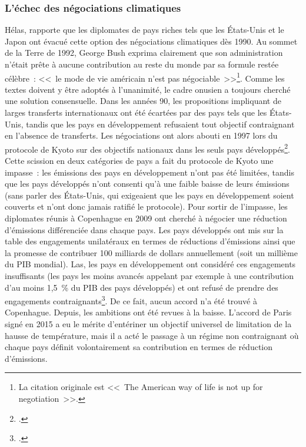 \documentclass[a5paper,french]{memoir}
\begin{document}
\subsubsection{L'échec des négociations climatiques}
Hélas, \citet{bertram_tradeable_1992} rapporte que les diplomates de pays riches tels que les États-Unis et le Japon ont évacué cette option des négociations climatiques dès 1990. Au sommet de la Terre de 1992, George Bush exprima clairement que son administration n'était prête à aucune contribution au reste du monde par sa formule restée célèbre~: <<~le mode de vie américain n'est pas négociable~>>\footnote{La citation originale est <<~The American way of life is not up for negotiation~>>.}. %
Comme les textes doivent y être adoptés à l'unanimité, le cadre onusien a toujours cherché une solution consensuelle. Dans les années 90, les propositions impliquant de larges transferts internationaux ont été écartées par des pays tels que les États-Unis, tandis que les pays en développement refusaient tout objectif contraignant en l'absence de transferts. Les négociations ont alors abouti en 1997 lors du protocole de Kyoto sur des objectifs nationaux dans les seuls pays développés\footnote{\cite{gupta_history_2010}.}. Cette scission en deux catégories de pays a fait du protocole de Kyoto une impasse~: les émissions des pays en développement n'ont pas été limitées, tandis que les pays développés n'ont consenti qu'à une faible baisse de leurs émissions (sans parler des États-Unis, qui exigeaient que les pays en développement soient couverts et n'ont donc jamais ratifié le protocole). Pour sortir de l'impasse, les diplomates réunis à Copenhague en 2009 ont cherché à négocier une réduction d'émissions différenciée dans chaque pays. Les pays développés ont mis sur la table des engagements unilatéraux en termes de réductions d'émissions ainsi que la promesse de contribuer 100 milliards de dollars annuellement (soit un millième du PIB mondial). Las, les pays en développement ont considéré ces engagements insuffisants (les pays les moins avancés appelant par exemple à une contribution d'au moins 1,5~\% du PIB des pays développés) et ont refusé de prendre des engagements contraignants\footnote{\cite{dimitrov_inside_2010}.}. De ce fait, aucun accord n'a été trouvé à Copenhague. Depuis, les ambitions ont été revues à la baisse. L'accord de Paris signé en 2015  a eu le mérite d'entériner un objectif universel de limitation de la hausse de température, mais il a acté le passage à un régime non contraignant où chaque pays définit volontairement sa contribution en termes de réduction d'émissions. 
\end{document}
